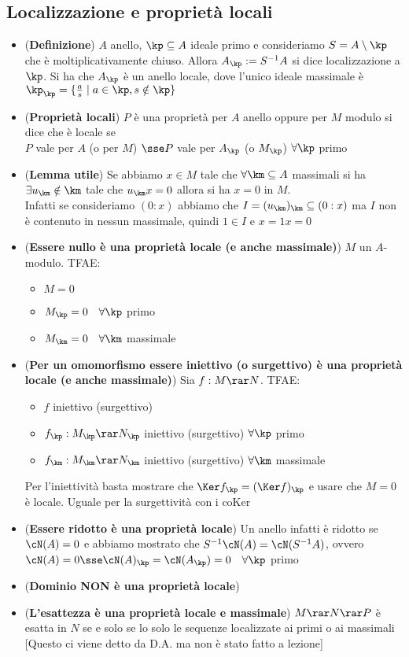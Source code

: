 \documentclass[a4paper,NoNotes,GeneralMath]{stdmdoc}
\newcommand{\coKer}{\text{coKer }}
\begin{document}
	\subsection*{Localizzazione e proprietà locali}
	\begin{itemize}
		\item ({\bf Definizione}) $A$ anello, $\kp \subseteq A$ ideale primo e consideriamo $S = A \setminus \kp$ che è moltiplicativamente chiuso. Allora $A_\kp := S^{-1}A$ si dice localizzazione a $\kp$. Si ha che $A_\kp$ è un anello locale, dove l'unico ideale massimale è $\kp_\kp = \{ \frac{a}{s} \mid a \in \kp, s \notin \kp \}$
		\item ({\bf Proprietà locali}) $P$ è una proprietà per $A$ anello oppure per $M$ modulo si dice che è locale se \\
			$P$ vale per $A$ (o per $M$) $\sse P$ vale per $A_\kp$ (o $M_\kp$) $\forall \kp$ primo
		\item ({\bf Lemma utile}) Se abbiamo $x \in M$ tale che $\forall \km \subseteq A$ massimali si ha $\exists u_\km \notin \km$ tale che $u_\km x = 0$ allora si ha $x = 0$ in $M$. \\
			Infatti se consideriamo $(0 : x)$ abbiamo che $I = (u_\km)_\km \subseteq (0 : x)$ ma $I$ non è contenuto in nessun massimale, quindi $1 \in I$ e $x = 1 x = 0$
		\item ({\bf Essere nullo è una proprietà locale (e anche massimale)}) $M$ un $A$-modulo. TFAE:
			\begin{itemize}
				\item $M = 0$
				\item $M_\kp = 0 \quad \forall \kp$ primo
				\item $M_\km = 0 \quad \forall \km$ massimale
			\end{itemize}
		\item ({\bf Per un omomorfismo essere iniettivo (o surgettivo) è una proprietà locale (e anche massimale)}) Sia $f: M \rar N$. TFAE:
			\begin{itemize}
				\item $f$ iniettivo (surgettivo)
				\item $f_\kp: M_\kp \rar N_\kp$ iniettivo (surgettivo) $\forall \kp$ primo
				\item $f_\km: M_\km \rar N_\km$ iniettivo (surgettivo) $\forall \km$ massimale
			\end{itemize}
			Per l'iniettività basta mostrare che $\Ker f_\kp = (\Ker f)_\kp$ e usare che $M = 0$ è locale. Uguale per la surgettività con i $\coKer$
		\item ({\bf Essere ridotto è una proprietà locale}) Un anello infatti è ridotto se $\cN(A) = 0$ e abbiamo mostrato che $S^{-1}\cN(A) = \cN(S^{-1}A)$, ovvero $\cN(A) = 0 \sse \cN(A)_\kp = \cN(A_\kp) = 0 \quad \forall \kp$ primo
		\item ({\bf Dominio NON è una proprietà locale})
		\item ({\bf L'esattezza è una proprietà locale e massimale}) $M \rar N \rar P$ è esatta in $N$ se e solo se lo solo le sequenze localizzate ai primi o ai massimali [Questo ci viene detto da D.A. ma non è stato fatto a lezione]
	\end{itemize}
	
\end{document}
